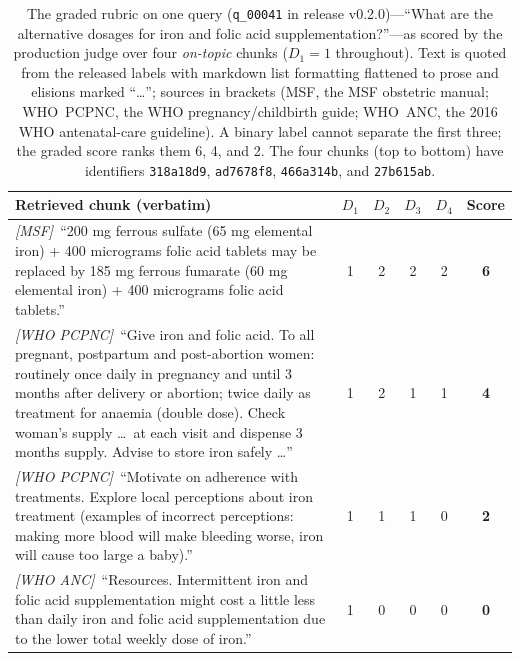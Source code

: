 \begin{table}[t]
\centering
\small
\setlength{\tabcolsep}{4pt}
\renewcommand{\arraystretch}{1.2}
\caption{The graded rubric on one query (\texttt{q\_00041} in release
v0.2.0)---``What are the alternative dosages for iron and folic acid
supplementation?''---as scored by the production judge over four \emph{on-topic}
chunks ($D_1{=}1$ throughout). Text is quoted from the released labels with
markdown list formatting flattened to prose and elisions marked ``\dots'';
sources in brackets (MSF, the MSF obstetric manual; WHO~PCPNC, the WHO
pregnancy/childbirth guide; WHO~ANC, the 2016 WHO antenatal-care guideline). A
binary label cannot separate the first three; the graded score ranks them 6, 4,
and 2. The four chunks (top to bottom) have identifiers \texttt{318a18d9},
\texttt{ad7678f8}, \texttt{466a314b}, and \texttt{27b615ab}.}
\label{tab:rubric-example}
\begin{tabular}{@{}p{}@{\hspace{5pt}}ccccc@{}}
\toprule
Retrieved chunk (verbatim) & $D_1$ & $D_2$ & $D_3$ & $D_4$ & Score \\
\midrule
\emph{[MSF]}~``200 mg ferrous sulfate (65 mg elemental iron) + 400 micrograms
folic acid tablets may be replaced by 185 mg ferrous fumarate (60 mg elemental
iron) + 400 micrograms folic acid tablets.'' & 1 & 2 & 2 & 2 & \textbf{6} \\
\addlinespace
\emph{[WHO PCPNC]}~``Give iron and folic acid. To all pregnant, postpartum and
post-abortion women: routinely once daily in pregnancy and until 3 months after
delivery or abortion; twice daily as treatment for anaemia (double dose). Check
woman's supply \dots\ at each visit and dispense 3 months supply. Advise to store
iron safely \dots'' & 1 & 2 & 1 & 1 & \textbf{4} \\
\addlinespace
\emph{[WHO PCPNC]}~``Motivate on adherence with treatments. Explore local
perceptions about iron treatment (examples of incorrect perceptions: making more
blood will make bleeding worse, iron will cause too large a baby).'' & 1 & 1 & 1
& 0 & \textbf{2} \\
\addlinespace
\emph{[WHO ANC]}~``Resources. Intermittent iron and folic acid supplementation
might cost a little less than daily iron and folic acid supplementation due to
the lower total weekly dose of iron.'' & 1 & 0 & 0 & 0 & \textbf{0} \\
\bottomrule
\end{tabular}
\end{table}

